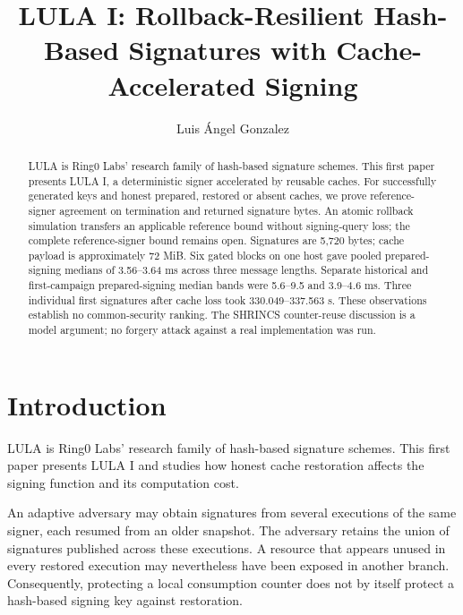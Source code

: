 \documentclass[a4paper,envcountsame,runningheads]{llncs}
\begin{document}
\raggedbottom
\title{LULA I: Rollback-Resilient Hash-Based Signatures with Cache-Accelerated Signing}
\author{Luis \'Angel Gonzalez}
\maketitle
\thispagestyle{plain}
\begin{abstract}
LULA is Ring0 Labs' research family of hash-based signature schemes. This first paper presents LULA I, a deterministic signer accelerated by reusable caches. For successfully generated keys and honest prepared, restored or absent caches, we prove reference-signer agreement on termination and returned signature bytes. An atomic rollback simulation transfers an applicable reference bound without signing-query loss; the complete reference-signer bound remains open. Signatures are 5,720 bytes; cache payload is approximately 72 MiB. Six gated blocks on one host gave pooled prepared-signing medians of 3.56--3.64 ms across three message lengths. Separate historical and first-campaign prepared-signing median bands were 5.6--9.5 and 3.9--4.6 ms. Three individual first signatures after cache loss took 330.049--337.563 s. These observations establish no common-security ranking. The SHRINCS counter-reuse discussion is a model argument; no forgery attack against a real implementation was run.
\end{abstract}

\section{Introduction}\label{sec:introduction}
LULA is Ring0 Labs' research family of hash-based signature schemes. This first paper presents LULA I and studies how honest cache restoration affects the signing function and its computation cost.

An adaptive adversary may obtain signatures from several executions of the same signer, each resumed from an older snapshot. The adversary retains the union of signatures published across these executions. A resource that appears unused in every restored execution may nevertheless have been exposed in another branch. Consequently, protecting a local consumption counter does not by itself protect a hash-based signing key against restoration.
\end{document}
